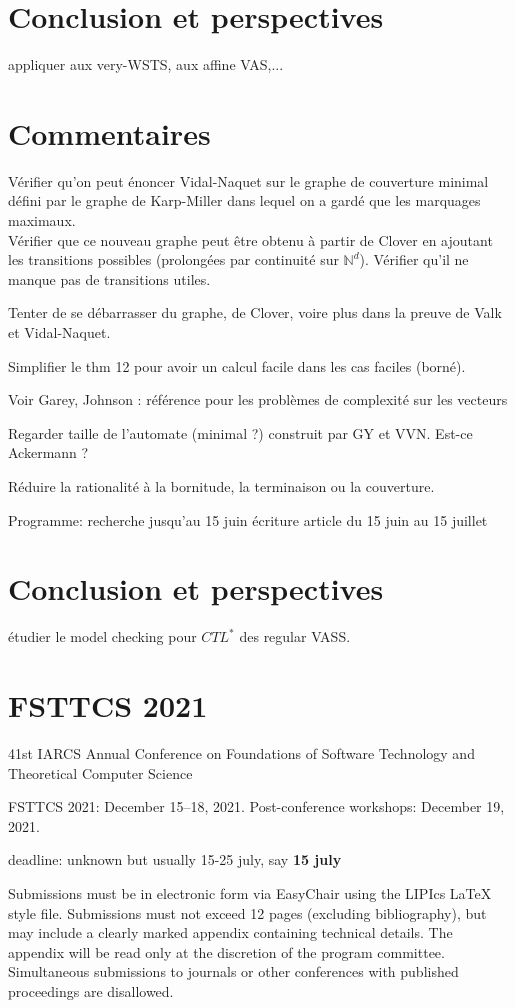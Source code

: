 \documentclass[a4paper,final]{article}
\theoremstyle{definition}
\newcommand{\N}{\ensuremath{\mathbb{N}}}
\begin{document}
\section{Conclusion et perspectives}

appliquer aux very-WSTS, aux affine VAS,...

\section{Commentaires}
Vérifier qu'on peut énoncer Vidal-Naquet sur le graphe de couverture minimal défini par le graphe de Karp-Miller dans lequel on a gardé que les marquages maximaux.\\
Vérifier que ce nouveau graphe peut être obtenu à partir de Clover en ajoutant les transitions possibles (prolongées par continuité sur $\N^d$). Vérifier qu'il ne manque pas de transitions utiles.

Tenter de se débarrasser du graphe, de Clover, voire plus dans la preuve de Valk et Vidal-Naquet.

Simplifier le thm 12 pour avoir un calcul facile dans les cas faciles (borné).

Voir Garey, Johnson : référence pour les problèmes de complexité sur les vecteurs

Regarder taille de l'automate (minimal ?) construit par GY et VVN. Est-ce Ackermann ?

Réduire la rationalité à la bornitude, la terminaison ou la couverture.

Programme:
recherche jusqu'au 15 juin
écriture article du 15 juin au 15 juillet \\

\section{Conclusion et perspectives}

étudier le model checking pour $CTL^*$ des regular VASS.


\section{FSTTCS 2021}  
41st IARCS Annual Conference on
Foundations of Software Technology and Theoretical Computer Science

    FSTTCS 2021: December 15–18, 2021.
    Post-conference workshops: December 19, 2021.

deadline: unknown but usually 15-25 july, say {\bf 15 july}

Submissions must be in electronic form via EasyChair using the LIPIcs LaTeX style file. Submissions must not exceed 12 pages (excluding bibliography), but may include a clearly marked appendix containing technical details. The appendix will be read only at the discretion of the program committee. Simultaneous submissions to journals or other conferences with published proceedings are disallowed. 




\end{document}
